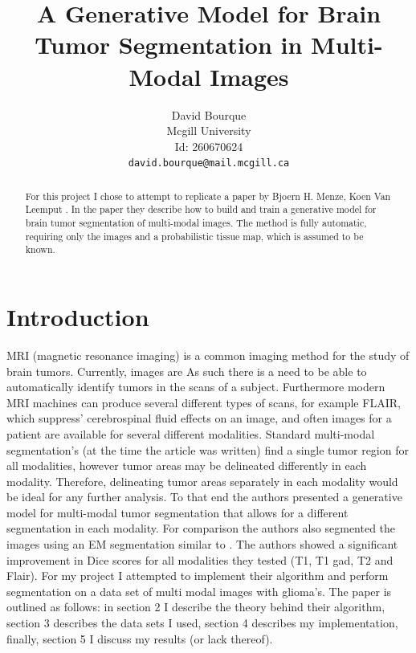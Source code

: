 \documentclass[10pt,twocolumn,letterpaper]{article}
\begin{document}
\title{A Generative Model for Brain Tumor Segmentation in Multi-Modal Images}

\author{David Bourque\\
Mcgill University\\
Id: 260670624\\
{\tt\small david.bourque@mail.mcgill.ca}
}

\maketitle

\begin{abstract}
	For this project I chose to attempt to replicate a paper by Bjoern H. Menze, Koen Van Leemput \etal\cite{Menze2010}. In the paper they describe how to build and train a generative model for brain tumor segmentation of multi-modal images. The method is fully automatic, requiring only the images and a probabilistic tissue map, which is assumed to be known. 
\end{abstract}

\section{Introduction}

MRI (magnetic resonance imaging) is a common imaging method for the study of brain tumors. Currently, images are  As such there is a need to be able to automatically identify tumors in the scans of a subject. Furthermore modern MRI machines can produce several different types of scans, for example FLAIR, which suppress' cerebrospinal fluid effects on an image, and often images for a patient are available for several different modalities. Standard multi-modal segmentation's (at the time the article was written) find a single tumor region for all modalities, however tumor areas may be delineated differently in each modality. Therefore, delineating tumor areas separately in each modality would be ideal for any further analysis. To that end the authors presented a generative model for multi-modal tumor segmentation that allows for a different segmentation in each modality. For comparison the authors also segmented the images using an EM segmentation similar to \cite{Prastawa}. The authors showed a significant improvement in Dice scores for all modalities they tested (T1, T1 gad, T2 and Flair). For my project I attempted to implement their algorithm and perform segmentation on a data set of multi modal images with glioma's. The paper is outlined as follows: in section 2 I describe the theory behind their algorithm, section 3 describes the data sets I used, section 4 describes my implementation, finally, section 5 I discuss my results (or lack thereof).
\end{document}
